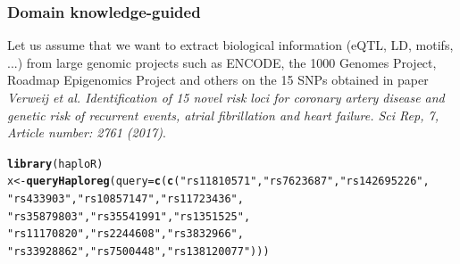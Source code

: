 \documentclass[10pt,xcolor=dvipsnames]{beamer}\usepackage[]{graphicx}\usepackage[]{color}
\makeatletter
\newcommand{\hlstr}[1]{\textcolor[rgb]{0.192,0.494,0.8}{#1}}%
\newcommand{\hlstd}[1]{\textcolor[rgb]{0.345,0.345,0.345}{#1}}%
\newcommand{\hlkwb}[1]{\textcolor[rgb]{0.69,0.353,0.396}{#1}}%
\newcommand{\hlkwc}[1]{\textcolor[rgb]{0.333,0.667,0.333}{#1}}%
\newcommand{\hlkwd}[1]{\textcolor[rgb]{0.737,0.353,0.396}{\textbf{#1}}}%
\newenvironment{kframe}{%
 \def\at@end@of@kframe{}%
 \ifinner\ifhmode%
  \def\at@end@of@kframe{\end{minipage}}%
  \begin{minipage}{\columnwidth}%
 \fi\fi%
 \def\FrameCommand##1{\hskip\@totalleftmargin \hskip-\fboxsep
 \colorbox{shadecolor}{##1}\hskip-\fboxsep
     \hskip-\linewidth \hskip-\@totalleftmargin \hskip\columnwidth}%
 \MakeFramed {\advance\hsize-\width
   \@totalleftmargin\z@ \linewidth\hsize
   \@setminipage}}%
 {\par\unskip\endMakeFramed%
 \at@end@of@kframe}
\newenvironment{knitrout}{}{} %
\makeatother
\begin{document}
\begin{frame}[fragile]\frametitle{Domain knowledge-guided}

Let us assume that we want to extract biological information (eQTL, LD, motifs, ...) from large genomic projects such as ENCODE, the 1000 Genomes Project, Roadmap Epigenomics Project and others on the 15 SNPs obtained in paper \textit{Verweij et al. Identification of 15 novel risk loci for coronary artery disease and genetic risk of recurrent events, atrial fibrillation and heart failure. Sci Rep, 7, Article number: 2761 (2017)}. 
\begin{knitrout}\footnotesize
{}\color{fgcolor}\begin{kframe}
\begin{alltt}
\hlkwd{library}\hlstd{(haploR)}
\hlstd{x} \hlkwb{<-} \hlkwd{queryHaploreg}\hlstd{(}\hlkwc{query}\hlstd{=}\hlkwd{c}\hlstd{(}\hlkwd{c}\hlstd{(}\hlstr{"rs11810571"}\hlstd{,} \hlstr{"rs7623687"}\hlstd{,} \hlstr{"rs142695226"}\hlstd{,}
                             \hlstr{"rs433903"}\hlstd{,} \hlstr{"rs10857147"}\hlstd{,} \hlstr{"rs11723436"}\hlstd{,}
                             \hlstr{"rs35879803"}\hlstd{,} \hlstr{"rs35541991"}\hlstd{,} \hlstr{"rs1351525"}\hlstd{,}
                             \hlstr{"rs11170820"}\hlstd{,} \hlstr{"rs2244608"}\hlstd{,} \hlstr{"rs3832966"}\hlstd{,}
                             \hlstr{"rs33928862"}\hlstd{,} \hlstr{"rs7500448"}\hlstd{,} \hlstr{"rs138120077"}\hlstd{)))}
\end{alltt}
\end{kframe}
\end{knitrout}

\end{frame}
\end{document}

